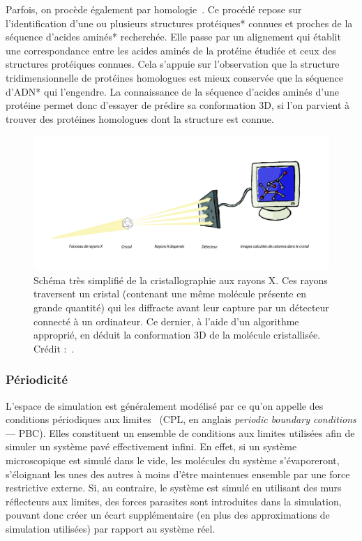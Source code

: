	Parfois, on procède également par homologie~\cite{marti2000comparative, kaczanowski2010similar}. Ce procédé repose sur l'identification d'une ou plusieurs structures protéiques* connues et proches de la séquence d'acides aminés* recherchée. Elle passe par un alignement qui établit une correspondance entre les acides aminés de la protéine étudiée et ceux des structures protéiques connues. Cela s'appuie sur l'observation que la structure tridimensionnelle de protéines homologues est mieux conservée que la séquence d'ADN* qui l'engendre. La connaissance de la séquence d'acides aminés d'une protéine permet donc d'essayer de prédire sa conformation 3D, si l'on parvient à trouver des protéines homologues dont la structure est connue.
	
	\begin{figure}[!htbp]
		\centering
		\includegraphics[width=\textwidth]{figures/ch1/crystal}
		\caption[Schéma très simplifié de la cristallographie aux rayons X]{Schéma très simplifié de la cristallographie aux rayons X. Ces rayons traversent un cristal (contenant une même molécule présente en grande quantité) qui les diffracte avant leur capture par un détecteur connecté à un ordinateur. Ce dernier, à l'aide d'un algorithme approprié, en déduit la conformation 3D de la molécule cristallisée. Crédit :~\cite{trellet2015exploration}.}
		\label{fig:crystal}
	\end{figure}
	
	\subsubsection{Périodicité}
	L'espace de simulation est généralement modélisé par ce qu'on appelle des conditions périodiques aux limites~\cite{cheatham1995molecular} (CPL, en anglais \emph{periodic boundary conditions} --- PBC). Elles constituent un ensemble de conditions aux limites utilisées afin de simuler un système pavé effectivement infini. En effet, si un système microscopique est simulé dans le vide, les molécules du système s'évaporeront, s'éloignant les unes des autres à moins d'être maintenues ensemble par une force restrictive externe. Si, au contraire, le système est simulé en utilisant des murs réflecteurs aux limites, des forces parasites sont introduites dans la simulation, pouvant donc créer un écart supplémentaire (en plus des approximations de simulation utilisées) par rapport au système réel.
	

